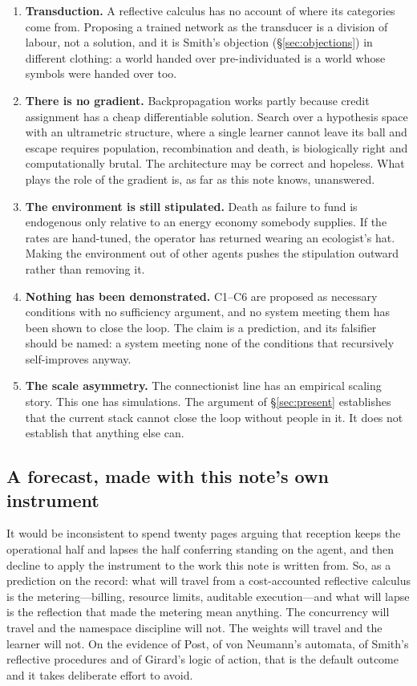 \documentclass[11pt,a4paper]{article}
\begin{document}
\begin{enumerate}[label=(\alph*),leftmargin=2.2em,itemsep=0.2em]
\item \textbf{Transduction.} A reflective calculus has no account of where its
categories come from. Proposing a trained network as the transducer is a
division of labour, not a solution, and it is Smith's objection
(\S\ref{sec:objections}) in different clothing: a world handed over
pre-individuated is a world whose symbols were handed over too.
\item \textbf{There is no gradient.} Backpropagation works partly because credit
assignment has a cheap differentiable solution. Search over a hypothesis space
with an ultrametric structure, where a single learner cannot leave its ball and
escape requires population, recombination and death, is biologically right and
computationally brutal. The architecture may be correct and hopeless. What plays
the role of the gradient is, as far as this note knows, unanswered.
\item \textbf{The environment is still stipulated.} Death as failure to fund is
endogenous only relative to an energy economy somebody supplies. If the rates are
hand-tuned, the operator has returned wearing an ecologist's hat. Making the
environment out of other agents pushes the stipulation outward rather than
removing it.
\item \textbf{Nothing has been demonstrated.} C1--C6 are proposed as necessary
conditions with no sufficiency argument, and no system meeting them has been
shown to close the loop. The claim is a prediction, and its falsifier should be
named: a system meeting none of the conditions that recursively self-improves
anyway.
\item \textbf{The scale asymmetry.} The connectionist line has an empirical
scaling story. This one has simulations. The argument of \S\ref{sec:present}
establishes that the current stack cannot close the loop without people in it. It
does not establish that anything else can.
\end{enumerate}

\subsection{A forecast, made with this note's own instrument}

It would be inconsistent to spend twenty pages arguing that reception keeps the
operational half and lapses the half conferring standing on the agent, and then
decline to apply the instrument to the work this note is written from. So, as a
prediction on the record: what will travel from a cost-accounted reflective
calculus is the metering---billing, resource limits, auditable execution---and
what will lapse is the reflection that made the metering mean anything. The
concurrency will travel and the namespace discipline will not. The weights will
travel and the learner will not. On the evidence of Post, of von Neumann's
automata, of Smith's reflective procedures and of Girard's logic of action, that
is the default outcome and it takes deliberate effort to avoid.
\end{document}
